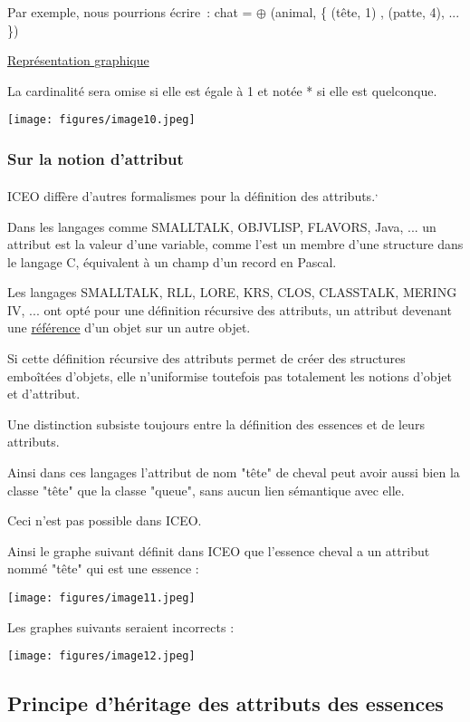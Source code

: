 \documentclass[a4paper, 12pt, openright, french]{book}
\begin{document}
Par exemple, nous pourrions écrire~: chat = $\oplus$ (animal, \{ (tête, 1) ,
(patte, 4), ... \})

\uline{Représentation graphique}

La cardinalité sera omise si elle est égale à 1 et notée * si elle est
quelconque.

\texttt{[image: figures/image10.jpeg]}

\subsubsection{Sur la notion d'attribut}

ICEO diffère d'autres formalismes pour la définition des
attributs.\textsuperscript{,}

Dans les langages comme SMALLTALK, OBJVLISP, FLAVORS, Java, ... un
attribut est la valeur d'une variable, comme l'est un membre
d'une structure dans le langage C, équivalent à un champ
d'un record en Pascal.

Les langages SMALLTALK, RLL, LORE, KRS, CLOS, CLASSTALK, MERING IV, ...
ont opté pour une définition récursive des attributs, un attribut
devenant une \uline{référence} d'un objet sur un autre
objet.

Si cette définition récursive des attributs permet de créer des
structures emboîtées d'objets, elle
n'uniformise toutefois pas totalement les notions
d'objet et d'attribut.

Une distinction subsiste toujours entre la définition des essences et de
leurs attributs.

Ainsi dans ces langages l'attribut de nom "tête" de
cheval peut avoir aussi bien la classe "tête" que la classe "queue",
sans aucun lien sémantique avec elle.

Ceci n'est pas possible dans ICEO.

Ainsi le graphe suivant définit dans ICEO que l'essence
cheval a un attribut nommé "tête" qui est une essence :

\texttt{[image: figures/image11.jpeg]}

Les graphes suivants seraient incorrects :

\texttt{[image: figures/image12.jpeg]}


\newpage
\subsection{Principe d'héritage des attributs des essences}
\end{document}
